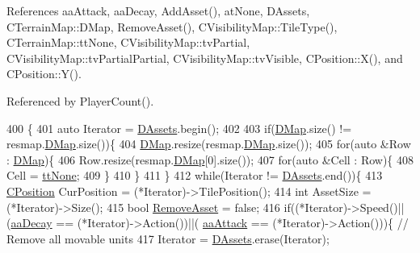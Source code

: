 References aa\+Attack, aa\+Decay, Add\+Asset(), at\+None, D\+Assets, C\+Terrain\+Map\+::\+D\+Map, Remove\+Asset(), C\+Visibility\+Map\+::\+Tile\+Type(), C\+Terrain\+Map\+::tt\+None, C\+Visibility\+Map\+::tv\+Partial, C\+Visibility\+Map\+::tv\+Partial\+Partial, C\+Visibility\+Map\+::tv\+Visible, C\+Position\+::\+X(), and C\+Position\+::\+Y().



Referenced by Player\+Count().


\begin{DoxyCode}
400                                                                                                 \{
401     \textcolor{keyword}{auto} Iterator = \hyperlink{classCAssetDecoratedMap_a94eeed5b16141169b1ba6cb3842055aa}{DAssets}.begin();
402     
403     \textcolor{keywordflow}{if}(\hyperlink{classCTerrainMap_a80d154ce478948b10473534a7bca13f6}{DMap}.size() != resmap.\hyperlink{classCTerrainMap_a80d154ce478948b10473534a7bca13f6}{DMap}.size())\{
404         \hyperlink{classCTerrainMap_a80d154ce478948b10473534a7bca13f6}{DMap}.resize(resmap.\hyperlink{classCTerrainMap_a80d154ce478948b10473534a7bca13f6}{DMap}.size());
405         \textcolor{keywordflow}{for}(\textcolor{keyword}{auto} &Row : \hyperlink{classCTerrainMap_a80d154ce478948b10473534a7bca13f6}{DMap})\{
406             Row.resize(resmap.\hyperlink{classCTerrainMap_a80d154ce478948b10473534a7bca13f6}{DMap}[0].size());
407             \textcolor{keywordflow}{for}(\textcolor{keyword}{auto} &Cell : Row)\{
408                 Cell = \hyperlink{classCTerrainMap_aff2ab991e237269941416dd79d8871d4a481e779132fb16414d17870bd6229eb5}{ttNone};
409             \}
410         \}
411     \}
412     \textcolor{keywordflow}{while}(Iterator != \hyperlink{classCAssetDecoratedMap_a94eeed5b16141169b1ba6cb3842055aa}{DAssets}.end())\{
413         \hyperlink{classCPosition}{CPosition} CurPosition = (*Iterator)->TilePosition();
414         \textcolor{keywordtype}{int} AssetSize = (*Iterator)->Size();
415         \textcolor{keywordtype}{bool} \hyperlink{classCAssetDecoratedMap_a77f46be1ceb30bb83fc3f35c0d58a9a7}{RemoveAsset} = \textcolor{keyword}{false};
416         \textcolor{keywordflow}{if}((*Iterator)->Speed()||(\hyperlink{GameDataTypes_8h_ab47668e651a3032cfb9c40ea2d60d670a5529d58a84a26b10744433d7bf171451}{aaDecay} == (*Iterator)->Action())||(
      \hyperlink{GameDataTypes_8h_ab47668e651a3032cfb9c40ea2d60d670a948eefd20b9e43d3b4cfcf613774716d}{aaAttack} == (*Iterator)->Action()))\{  \textcolor{comment}{// Remove all movable units}
417             Iterator = \hyperlink{classCAssetDecoratedMap_a94eeed5b16141169b1ba6cb3842055aa}{DAssets}.erase(Iterator);

\end{DoxyCode}
